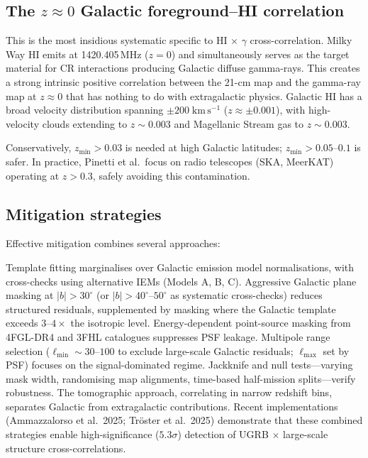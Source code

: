 \documentclass[10pt,a4paper]{article}
\begin{document}
\subsection{The $z \approx 0$ Galactic foreground--HI correlation}
\label{sec:gal_HI_corr}

This is the most insidious systematic specific to HI$\,\times\,\gamma$ cross-correlation. Milky Way HI emits at 1420.405\,MHz ($z = 0$) and simultaneously serves as the target material for CR interactions producing Galactic diffuse gamma-rays. This creates a strong intrinsic positive correlation between the 21-cm map and the gamma-ray map at $z \approx 0$ that has nothing to do with extragalactic physics. Galactic HI has a broad velocity distribution spanning $\pm 200\;\mathrm{km\,s^{-1}}$ ($z \approx \pm 0.001$), with high-velocity clouds extending to $z \sim 0.003$ and Magellanic Stream gas to $z \sim 0.003$.

Conservatively, $z_{\min} > 0.03$ is needed at high Galactic latitudes; $z_{\min} > 0.05$--$0.1$ is safer. In practice, Pinetti et al.\ focus on radio telescopes (SKA, MeerKAT) operating at $z > 0.3$, safely avoiding this contamination.

\subsection{Mitigation strategies}

Effective mitigation combines several approaches:

Template fitting marginalises over Galactic emission model normalisations, with cross-checks using alternative IEMs (Models A, B, C). Aggressive Galactic plane masking at $|b| > 30^\circ$ (or $|b| > 40^\circ$--$50^\circ$ as systematic cross-checks) reduces structured residuals, supplemented by masking where the Galactic template exceeds $3$--$4\times$ the isotropic level. Energy-dependent point-source masking from 4FGL-DR4 and 3FHL catalogues suppresses PSF leakage. Multipole range selection ($\ell_{\min} \sim 30$--$100$ to exclude large-scale Galactic residuals; $\ell_{\max}$ set by PSF) focuses on the signal-dominated regime. Jackknife and null tests---varying mask width, randomising map alignments, time-based half-mission splits---verify robustness. The tomographic approach, correlating in narrow redshift bins, separates Galactic from extragalactic contributions. Recent implementations (Ammazzalorso et al.\ 2025; Tr\"{o}ster et al.\ 2025) demonstrate that these combined strategies enable high-significance ($5.3\sigma$) detection of UGRB$\,\times\,$large-scale structure cross-correlations.
\end{document}
